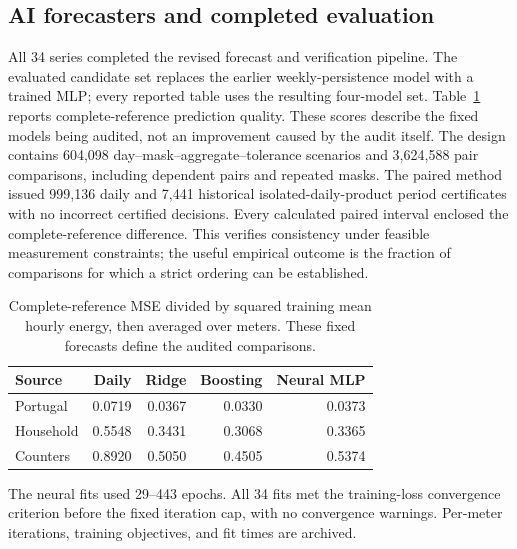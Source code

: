 \documentclass[12pt]{article}
\begin{document}
\FloatBarrier

\subsection{AI forecasters and completed evaluation}
All 34 series completed the revised forecast and verification pipeline.
The evaluated candidate set replaces the earlier weekly-persistence model with a
trained MLP; every reported table uses the resulting four-model set.
Table~\ref{tab:forecasts} reports complete-reference prediction quality.
These scores describe the fixed models being audited, not an improvement
caused by the audit itself. The design contains 604,098
day--mask--aggregate--tolerance scenarios and 3,624,588
pair comparisons, including dependent pairs and repeated masks.
The paired method issued 999,136 daily and
7,441 historical isolated-daily-product period certificates with no incorrect
certified decisions. Every calculated paired interval enclosed the
complete-reference difference. This verifies consistency under feasible
measurement constraints; the useful empirical outcome is the fraction of
comparisons for which a strict ordering can be established.
\begin{table}[htbp]
\centering\normalsize\setlength{\tabcolsep}{4pt}
\caption{Complete-reference MSE divided by squared training mean hourly energy, then averaged over meters. These fixed forecasts define the audited comparisons.}
\label{tab:forecasts}
\begin{tabular}{lrrrr}
\toprule
Source & Daily & Ridge & Boosting & Neural MLP\\
\midrule
Portugal & 0.0719 & 0.0367 & 0.0330 & 0.0373\\
Household & 0.5548 & 0.3431 & 0.3068 & 0.3365\\
Counters & 0.8920 & 0.5050 & 0.4505 & 0.5374\\
\bottomrule
\end{tabular}
\end{table}
The neural fits used 29--443 epochs.
All 34 fits met the training-loss convergence criterion
before the fixed iteration cap, with no convergence warnings. Per-meter
iterations, training objectives, and fit times are archived.
\end{document}
